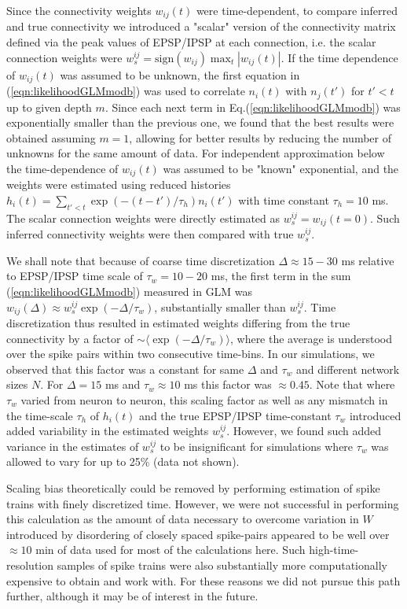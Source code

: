\documentclass[amsmath,amssymb]{revtex4}
\begin{document}
Since the connectivity weights $w_{ij}(t)$ were time-dependent, to compare inferred and true connectivity we introduced a "scalar" version of the connectivity matrix defined via the peak values of EPSP/IPSP at each connection, i.e. the scalar connection weights were $w^{ij}_s=\text{sign}(w_{ij})\max_{t} |w_{ij}(t)|$.
If the time dependence of $w_{ij}(t)$ was assumed to be unknown, the first equation in (\ref{eqn:likelihoodGLMmodb}) was used to correlate $n_i(t)$ with $n_j(t')$ for $t'<t$ up to given depth $m$.
Since each next term in Eq.(\ref{eqn:likelihoodGLMmodb}) was exponentially smaller than the previous one, we found that the best results were obtained assuming $m=1$, allowing for better results by reducing the number of unknowns for the same amount of data. 
For independent approximation below the time-dependence of $w_{ij}(t)$ was assumed to be "known" exponential, and the weights were estimated using reduced histories $h_{i}(t)=\sum_{t'<t} \exp(-(t-t')/\tau_h)n_{i}(t')$ with time constant $\tau_h=10$ ms. The scalar connection weights were directly estimated as $w^{ij}_s=w_{ij}(t=0)$.
Such inferred connectivity weights were then compared with true $w^{ij}_s$.

We shall note that because of coarse time discretization $\Delta \approx 15-30$ ms relative to EPSP/IPSP time scale of $\tau_w = 10-20$ ms, the first term in the sum (\ref{eqn:likelihoodGLMmodb}) measured in GLM was $w_{ij}(\Delta)\approx w^{ij}_s\exp(-\Delta/\tau_w)$, substantially smaller than $w^{ij}_s$. Time discretization thus resulted in estimated weights differing from the true connectivity by a factor of $\sim \langle \exp(-\Delta/\tau_w) \rangle$, where the average is understood over the spike pairs within two consecutive time-bins. In our simulations, we observed that this factor was a constant for same $\Delta$ and $\tau_w$ and different network sizes $N$. For $\Delta=15$ ms and $\tau_w\approx 10$ ms this factor was  $\approx 0.45$.
Note that where $\tau_w$ varied from neuron to neuron, this scaling factor as well as any mismatch in the time-scale $\tau_h$ of $h_i(t)$ and the true EPSP/IPSP time-constant $\tau_w$ introduced added variability in the estimated weights $w^{ij}_s$. However, we found such added variance in the estimates of $w^{ij}_s$ to be insignificant for simulations where $\tau_w$ was allowed to vary for up to 25\% (data not shown).

Scaling bias theoretically could be removed by performing estimation of spike trains with finely discretized time. However, we were not successful in performing this calculation as the amount of data necessary to overcome variation in $W$ introduced by disordering of closely spaced spike-pairs appeared to be well over $\approx 10$ min of data used for most of the calculations here. Such high-time-resolution samples of spike trains were also substantially more computationally expensive to obtain and work with. For these reasons we did not pursue this path further, although it may be of interest in the future.
\end{document}

